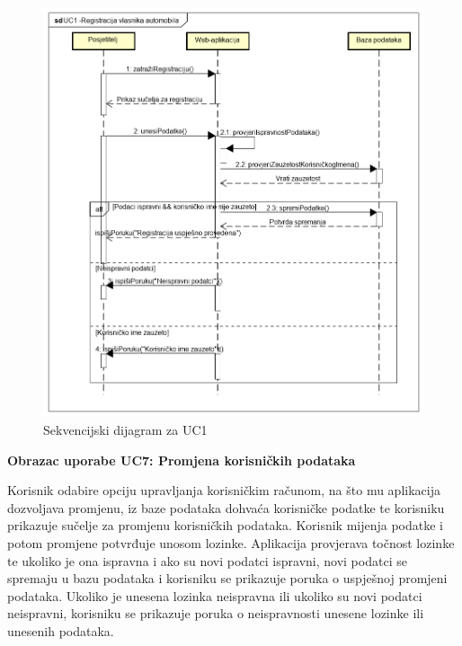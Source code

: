 \begin{figure}[H]
	\includegraphics[width=0.85\linewidth]{dijagrami/seq-dia-UC1.png}
	\centering
	\caption{Sekvencijski dijagram za UC1}
	\label{fig:sequence-diagram1}
\end{figure}

\eject

\noindent \textbf{Obrazac uporabe UC7: Promjena korisničkih podataka}

\noindent Korisnik odabire opciju upravljanja korisničkim računom, na što mu aplikacija dozvoljava promjenu, iz baze podataka dohvaća korisničke podatke te korisniku prikazuje sučelje za promjenu korisničkih podataka. Korisnik mijenja podatke i potom promjene potvrđuje unosom lozinke. Aplikacija provjerava točnost lozinke te ukoliko je ona ispravna i ako su novi podatci ispravni, novi podatci se spremaju u bazu podataka i korisniku se prikazuje poruka o uspješnoj promjeni podataka. Ukoliko je unesena lozinka neispravna ili ukoliko su novi podatci neispravni, korisniku se prikazuje poruka o neispravnosti unesene lozinke ili unesenih podataka.

